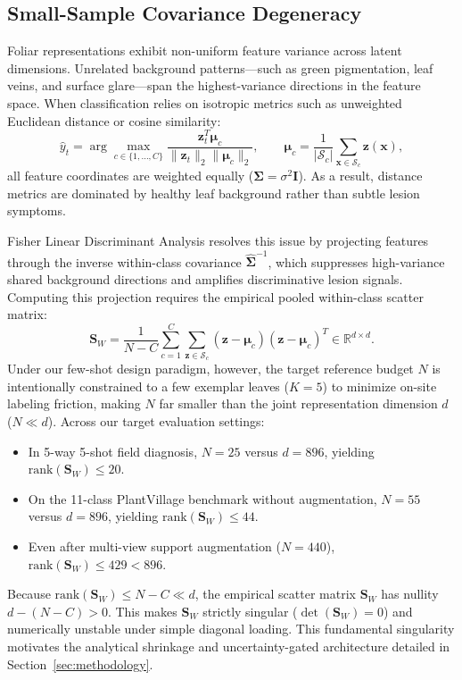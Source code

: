 \subsection{Small-Sample Covariance Degeneracy}
\label{sec:covariance_degeneracy}
Foliar representations exhibit non-uniform feature variance across latent dimensions. Unrelated background patterns---such as green pigmentation, leaf veins, and surface glare---span the highest-variance directions in the feature space. When classification relies on isotropic metrics such as unweighted Euclidean distance or cosine similarity:
\begin{equation}
    \hat{y}_t = \arg\max_{c \in \{1, \dots, C\}} \frac{\mathbf{z}_t^T \boldsymbol{\mu}_c}{\|\mathbf{z}_t\|_2 \|\boldsymbol{\mu}_c\|_2}, \qquad \boldsymbol{\mu}_c = \frac{1}{|\mathcal{S}_c|}\sum_{\mathbf{x} \in \mathcal{S}_c} \mathbf{z}(\mathbf{x}),
    \label{eq:isotropic_cosine}
\end{equation}
all feature coordinates are weighted equally ($\mathbf{\Sigma} = \sigma^2 \mathbf{I}$). As a result, distance metrics are dominated by healthy leaf background rather than subtle lesion symptoms.

Fisher Linear Discriminant Analysis resolves this issue by projecting features through the inverse within-class covariance $\hat{\mathbf{\Sigma}}^{-1}$, which suppresses high-variance shared background directions and amplifies discriminative lesion signals. Computing this projection requires the empirical pooled within-class scatter matrix:
\begin{equation}
    \mathbf{S}_W = \frac{1}{N - C} \sum_{c=1}^C \sum_{\mathbf{z} \in \mathcal{S}_c} (\mathbf{z} - \boldsymbol{\mu}_c)(\mathbf{z} - \boldsymbol{\mu}_c)^T \in \mathbb{R}^{d \times d}.
    \label{eq:empirical_scatter}
\end{equation}
Under our few-shot design paradigm, however, the target reference budget $N$ is intentionally constrained to a few exemplar leaves ($K=5$) to minimize on-site labeling friction, making $N$ far smaller than the joint representation dimension $d$ ($N \ll d$). Across our target evaluation settings:
\begin{itemize}
    \item In 5-way 5-shot field diagnosis, $N = 25$ versus $d = 896$, yielding $\text{rank}(\mathbf{S}_W) \le 20$.
    \item On the 11-class PlantVillage benchmark without augmentation, $N = 55$ versus $d = 896$, yielding $\text{rank}(\mathbf{S}_W) \le 44$.
    \item Even after multi-view support augmentation ($N = 440$), $\text{rank}(\mathbf{S}_W) \le 429 < 896$.
\end{itemize}
Because $\text{rank}(\mathbf{S}_W) \le N - C \ll d$, the empirical scatter matrix $\mathbf{S}_W$ has nullity $d - (N - C) > 0$. This makes $\mathbf{S}_W$ strictly singular ($\det(\mathbf{S}_W) = 0$) and numerically unstable under simple diagonal loading. This fundamental singularity motivates the analytical shrinkage and uncertainty-gated architecture detailed in Section~\ref{sec:methodology}.
